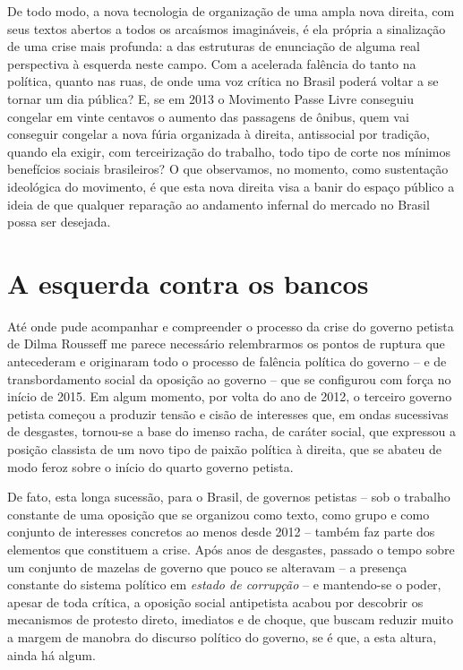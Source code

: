 De todo modo, a nova tecnologia de organização de uma ampla nova
direita, com seus textos abertos a todos os arcaísmos imagináveis, é ela
própria a sinalização de uma crise mais profunda: a das estruturas de
enunciação de alguma real perspectiva à esquerda neste campo. 
Com a acelerada falência do  tanto na política, quanto nas ruas, 
de onde uma voz crítica no Brasil poderá voltar a se tornar
um dia pública?
E, se em 2013 o Movimento Passe Livre conseguiu congelar
em vinte centavos o aumento das passagens de ônibus, quem vai conseguir
congelar a nova fúria organizada à direita, antissocial por tradição,
quando ela exigir, com terceirização do trabalho, todo tipo de corte nos
mínimos benefícios sociais brasileiros? O que observamos, no momento,
como sustentação ideológica do movimento, é que esta nova direita visa a
banir do espaço público a ideia de que qualquer reparação ao andamento
infernal do mercado no Brasil possa ser desejada.

  \section{A esquerda contra os
  bancos}\label{a-esquerda-contra-os-bancos}

Até onde pude acompanhar e compreender o processo da crise do governo
petista de Dilma Rousseff me parece necessário relembrarmos os pontos de
ruptura que antecederam e originaram todo o processo de falência
política do governo -- e de transbordamento social da oposição ao
governo -- que se configurou com força no início de 2015. Em algum
momento, por volta do ano de 2012, o terceiro governo petista começou a
produzir tensão e cisão de interesses que, em ondas
sucessivas de desgastes, tornou-se a base do imenso racha, de caráter
social, que expressou a posição classista de um novo tipo de paixão
política à direita, que se abateu de modo feroz sobre o início do quarto
governo petista.

De fato, esta longa sucessão, para o Brasil, de governos petistas – sob o
trabalho constante de uma oposição que se organizou como texto, como grupo e
como conjunto de interesses concretos ao menos desde 2012 – também faz parte dos
elementos que constituem a crise.
Após anos de desgastes, passado o tempo sobre um conjunto de mazelas de governo
que pouco se alteravam – a presença constante do sistema político em 
\emph{estado de corrupção} – e mantendo-se o poder, apesar de toda crítica, a oposição social
antipetista acabou por descobrir os mecanismos de protesto direto, imediatos e
de choque, que buscam reduzir muito a margem de manobra do discurso político do
governo, se é que, a esta altura, ainda há algum.

